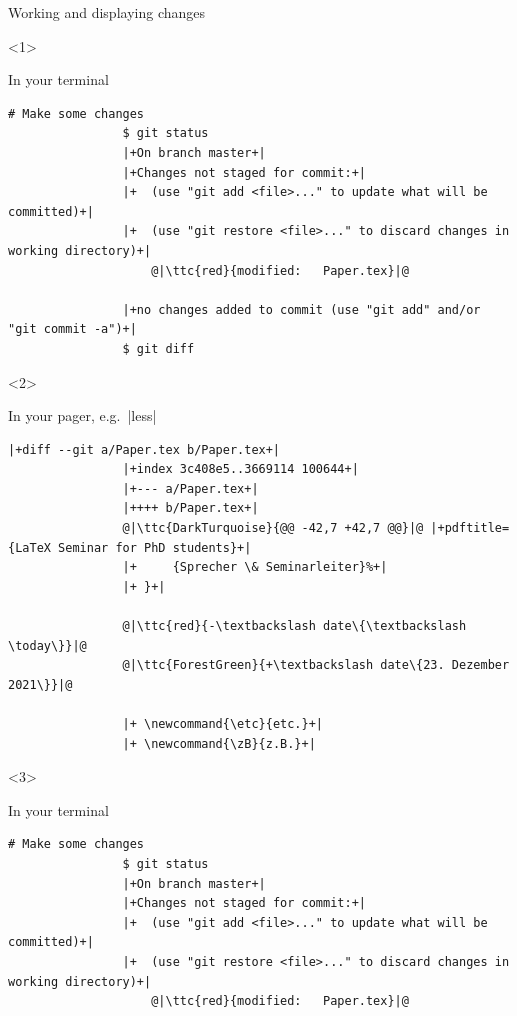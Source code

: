 \documentclass[usenames,svgnames,14pt]{beamer}
\newcommand{\ttc}[2]{\texttt{\textcolor{#1}{#2}}}
\begin{document}
\begin{frame}[fragile]{Working and displaying changes}
    \vspace{-0.0\textheight}
    \begin{overlayarea}{\textwidth}{0.7\textheight}
        \begin{onlyenv}<1>
            \centerline{In your terminal}
            \begin{lstlisting}[style=MyBash, aboveskip=2mm, xleftmargin=-6mm, xrightmargin=-6mm]
                # Make some changes
                $ git status
                |+On branch master+|
                |+Changes not staged for commit:+|
                |+  (use "git add <file>..." to update what will be committed)+|
                |+  (use "git restore <file>..." to discard changes in working directory)+|
                    @|\ttc{red}{modified:   Paper.tex}|@
                
                |+no changes added to commit (use "git add" and/or "git commit -a")+|
                $ git diff
            \end{lstlisting}
        \end{onlyenv}
        \begin{onlyenv}<2>
            \centerline{In your pager, e.g.\ \bash|less|}
            \begin{lstlisting}[style=MyBash, aboveskip=2mm]
                |+diff --git a/Paper.tex b/Paper.tex+|
                |+index 3c408e5..3669114 100644+|
                |+--- a/Paper.tex+|
                |++++ b/Paper.tex+|
                @|\ttc{DarkTurquoise}{@@ -42,7 +42,7 @@}|@ |+pdftitle={LaTeX Seminar for PhD students}+|
                |+     {Sprecher \& Seminarleiter}%+|
                |+ }+|
                
                @|\ttc{red}{-\textbackslash date\{\textbackslash \today\}}|@
                @|\ttc{ForestGreen}{+\textbackslash date\{23. Dezember 2021\}}|@
                
                |+ \newcommand{\etc}{etc.}+|
                |+ \newcommand{\zB}{z.B.}+|
            \end{lstlisting}
        \end{onlyenv}
        \begin{onlyenv}<3>
            \centerline{In your terminal}
            \begin{lstlisting}[style=MyBash, aboveskip=2mm, xleftmargin=-6mm, xrightmargin=-6mm]
                # Make some changes
                $ git status
                |+On branch master+|
                |+Changes not staged for commit:+|
                |+  (use "git add <file>..." to update what will be committed)+|
                |+  (use "git restore <file>..." to discard changes in working directory)+|
                    @|\ttc{red}{modified:   Paper.tex}|@
                

\end{lstlisting}
\end{onlyenv}
\end{overlayarea}
\end{frame}
\end{document}
